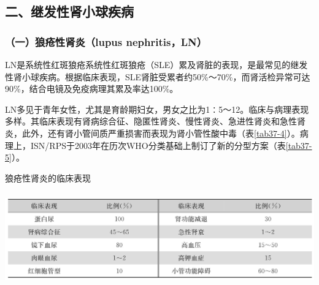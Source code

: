 \protect\hypertarget{text00292.html}{}{}

\subsection{二、继发性肾小球疾病}

\subsubsection{（一）狼疮性肾炎（lupus nephritis，LN）}

LN是系统性红斑狼疮系统性红斑狼疮（SLE）累及肾脏的表现，是最常见的继发性肾小球疾病。根据临床表现，SLE肾脏受累者约50\%～70\%，而肾活检异常可达90\%，结合电镜及免疫病理其累及率达100\%。

LN多见于青年女性，尤其是育龄期妇女，男女之比为1∶5～12。临床与病理表现多样。其临床表现有肾病综合征、隐匿性肾炎、慢性肾炎、急进性肾炎和急性肾炎，此外，还有肾小管间质严重损害而表现为肾小管性酸中毒（表\ref{tab37-4}）。病理上，ISN/RPS于2003年在历次WHO分类基础上制订了新的分型方案（表\ref{tab37-5}）。

\begin{table}[htbp]
\centering
\caption{狼疮性肾炎的临床表现}
\label{tab37-4}
\includegraphics[width=5.91667in,height=1.57292in]{./images/Image00235.jpg}
\end{table}

